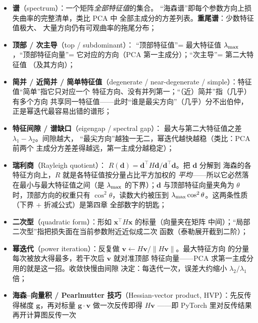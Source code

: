 \begin{itemize}
  \item \textbf{谱}（spectrum）：一个矩阵\emph{全部特征值}的集合。
        ``海森谱''即每个参数方向上损失曲率的完整清单，类比 PCA 中
        全部主成分的方差列表。\textbf{重尾谱}：少数特征值极大、
        大量方向仍有可观曲率的拖尾分布；
  \item \textbf{顶部 / 次主导}（top / subdominant）：
        ``顶部特征值''= 最大特征值 $\lambda_{\max}$，``顶部特征向量''=
        它对应的方向（PCA 第一主成分）；``次主导''= 第二大特征值
        （及其方向）；
  \item \textbf{简并 / 近简并 / 简单特征值}（degenerate /
        near-degenerate / simple）：特征值``简单''指它只对应一个
        特征方向、没有并列第一；``（近）简并''指（几乎）有多个方向
        共享同一特征值——此时``谁是最尖方向''（几乎）分不出伯仲，
        正是幂迭代最容易出错的谱形；
  \item \textbf{特征间隙 / 谱缺口}（eigengap / spectral gap）：
        最大与第二大特征值之差 $\lambda_1-\lambda_2$。间隙越大，
        ``最尖方向''越独一无二，幂迭代越快越稳（类比：PCA 前两个
        主成分方差差得越远，第一主成分越稳定）；
  \item \textbf{瑞利商}（Rayleigh quotient）：
        $R(\mathbf{d})=\mathbf{d}^{\!\top}\!H\mathbf{d}/
        \mathbf{d}^{\!\top}\!\mathbf{d}$。把 $\mathbf{d}$ 分解到
        海森的各特征方向上，$R$ 就是各特征值按分量占比平方加权的
        \emph{平均}——所以它必然落在最小与最大特征值之间（是
        $\lambda_{\max}$ 的下界）；$\mathbf{d}$ 与顶部特征向量夹角为 $\theta$
        时，顶部方向的权重只有 $\cos^2\theta$，读数大约被压到
        $\lambda_{\max}\cos^2\theta$。这两条性质（下界 + 折减公式）是第四章
        全部数字的钥匙；
  \item \textbf{二次型}（quadratic form）：形如
        $\mathbf{x}^{\!\top}\!H\mathbf{x}$ 的标量（向量夹在矩阵
        中间）；``局部二次型''指把损失面在当前参数附近近似成二次
        函数（泰勒展开截到二阶）；
  \item \textbf{幂迭代}（power iteration）：反复做
        $\mathbf{v}\gets H\mathbf{v}/\|H\mathbf{v}\|$。最大特征方向
        的分量每次被放大得最多，若干次后 $\mathbf{v}$ 就对准顶部
        特征向量——PCA 求第一主成分用的就是这一招。收敛快慢由间隙
        决定：每迭代一次，误差大约缩小 $\lambda_2/\lambda_1$ 倍；
  \item \textbf{海森--向量积 / Pearlmutter 技巧}（Hessian-vector
        product, HVP）：先反传得梯度 $\mathbf{g}$，再对标量
        $\mathbf{g}\!\cdot\!\mathbf{v}$ 做一次反传即得 $H\mathbf{v}$
        ——即 PyTorch 里对反传结果再开计算图反传一次

\end{itemize}
